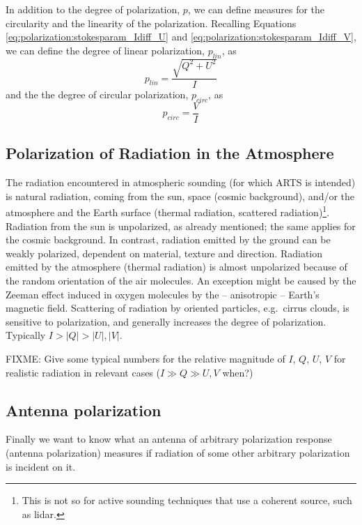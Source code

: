 In addition to the degree of polarization, $p$, we can define measures
for the circularity and the linearity of the polarization.
Recalling Equations \ref{eq:polarization:stokesparam_Idiff_U}
and \ref{eq:polarization:stokesparam_Idiff_V},
we can define the degree of linear polarization, $p_{lin}$, as
\begin{equation}
  \label{eq:polarization:p_lin}
 p_{lin} = \frac{\sqrt{Q^2 + U^2}}{I} 
\end{equation}
and the the degree of circular polarization, $p_{circ}$, as
\begin{equation}
  \label{eq:polarization:p_circ}
 p_{circ} = \frac{V}{I} 
\end{equation}


\subsection{Polarization of Radiation in the Atmosphere}
\label{sec:polarization:atmosphere}
The radiation encountered in atmospheric sounding (for which ARTS is
intended) is natural radiation, coming from the sun, space (cosmic
background), and/or the atmosphere and the Earth surface (thermal
radiation, scattered radiation)\footnote{This is not so for active
  sounding techniques that use a coherent source, such as lidar.}.
Radiation from the sun is unpolarized, as already mentioned; the same
applies for the cosmic background.  In contrast,
radiation emitted by the ground can be weakly polarized, dependent on
material, texture and direction.  Radiation emitted by the atmosphere
(thermal radiation) is almost unpolarized because of the random
orientation of the air molecules.  An exception might be caused by the
Zeeman effect induced in oxygen molecules by the -- anisotropic --
Earth's magnetic field.  Scattering of radiation by oriented
particles, e.g.\ cirrus clouds, is sensitive to polarization, and
generally increases the degree of polarization.  Typically $I > |Q| >
|U|,|V|$.

FIXME: Give some typical numbers for the relative magnitude of $I$,
$Q$, $U$, $V$
for realistic radiation in relevant cases ($I \gg Q \gg U,V$ when?)


\subsection{Antenna polarization}
\label{sec:polarization:antenna}
Finally we want to know what an antenna of arbitrary polarization
response (antenna polarization)
measures if radiation of some other arbitrary polarization is incident
on it.

